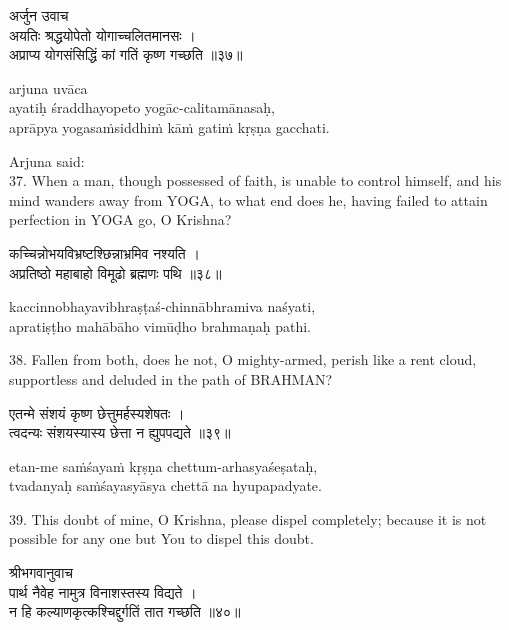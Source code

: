 \begin{gitaverse}
अर्जुन उवाच \\
अयतिः श्रद्धयोपेतो योगाच्चलितमानसः । \\
अप्राप्य योगसंसिद्धिं कां गतिं कृष्ण गच्छति ॥३७॥
\end{gitaverse}

\begin{transliteration}
arjuna uvāca \\
ayatiḥ śraddhayopeto yogāc-calitamānasaḥ, \\
aprāpya yogasaṁsiddhiṁ kāṁ gatiṁ kṛṣṇa gacchati.
\end{transliteration}

Arjuna said: \\
37. When a man, though possessed of faith, is unable to control himself, and
his mind wanders away from YOGA, to what end does he, having failed to attain
perfection in YOGA go, O Krishna?

\begin{gitaverse}
कच्चिन्नोभयविभ्रष्टश्छिन्नाभ्रमिव नश्यति । \\
अप्रतिष्ठो महाबाहो विमूढो ब्रह्मणः पथि ॥३८॥
\end{gitaverse}

\begin{transliteration}
kaccinnobhayavibhraṣṭaś-chinnābhramiva naśyati, \\
apratiṣṭho mahābāho vimūḍho brahmaṇaḥ pathi.
\end{transliteration}

38. Fallen from both, does he not, O mighty-armed, perish like a rent cloud,
supportless and deluded in the path of BRAHMAN?\@

\begin{gitaverse}
एतन्मे संशयं कृष्ण छेत्तुमर्हस्यशेषतः । \\
त्वदन्यः संशयस्यास्य छेत्ता न ह्युपपद्यते ॥३९॥
\end{gitaverse}

\begin{transliteration}
etan-me saṁśayaṁ kṛṣṇa chettum-arhasyaśeṣataḥ, \\
tvadanyaḥ saṁśayasyāsya chettā na hyupapadyate.
\end{transliteration}

39. This doubt of mine, O Krishna, please dispel completely; because it is not
possible for any one but You to dispel this doubt.

\begin{gitaverse}
श्रीभगवानुवाच \\
पार्थ नैवेह नामुत्र विनाशस्तस्य विद्यते । \\
न हि कल्याणकृत्कश्चिद्दुर्गतिं तात गच्छति ॥४०॥
\end{gitaverse}

